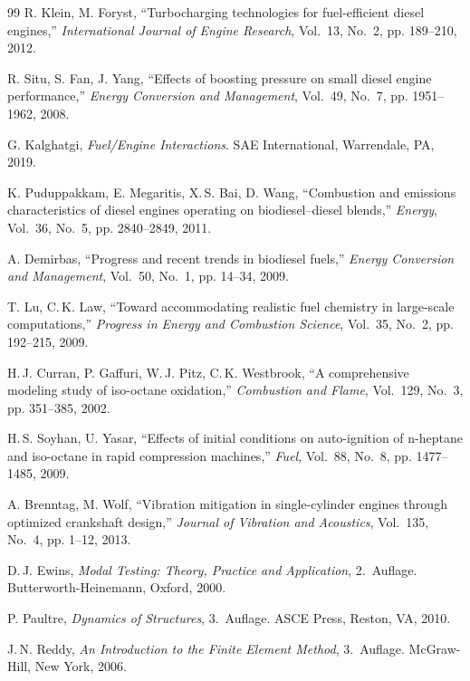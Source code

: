 ﻿\documentclass[a4paper,12pt]{article}
\begin{document}
\begin{thebibliography}{99}
	R. Klein, M. Foryst,
	``Turbocharging technologies for fuel-efficient diesel engines,''
	\textit{International Journal of Engine Research}, Vol.~13, No.~2, pp. 189--210, 2012.
	
	R. Situ, S. Fan, J. Yang,
	``Effects of boosting pressure on small diesel engine performance,''
	\textit{Energy Conversion and Management}, Vol.~49, No.~7, pp. 1951--1962, 2008.
	
	G. Kalghatgi,
	\textit{Fuel/Engine Interactions}.
	SAE International, Warrendale, PA, 2019.
	
	K. Puduppakkam, E. Megaritis, X.\,S. Bai, D. Wang,
	``Combustion and emissions characteristics of diesel engines operating on biodiesel--diesel blends,''
	\textit{Energy}, Vol.~36, No.~5, pp. 2840--2849, 2011.
	
	A. Demirbas,
	``Progress and recent trends in biodiesel fuels,''
	\textit{Energy Conversion and Management}, Vol.~50, No.~1, pp. 14--34, 2009.
	
	T. Lu, C.\,K. Law,
	``Toward accommodating realistic fuel chemistry in large-scale computations,''
	\textit{Progress in Energy and Combustion Science}, Vol.~35, No.~2, pp. 192--215, 2009.
	
	H.\,J. Curran, P. Gaffuri, W.\,J. Pitz, C.\,K. Westbrook,
	``A comprehensive modeling study of iso-octane oxidation,''
	\textit{Combustion and Flame}, Vol.~129, No.~3, pp. 351--385, 2002.
	
	H.\,S. Soyhan, U. Yasar,
	``Effects of initial conditions on auto-ignition of n-heptane and iso-octane in rapid compression machines,''
	\textit{Fuel}, Vol.~88, No.~8, pp. 1477--1485, 2009.
	
	A. Brenntag, M. Wolf,
	``Vibration mitigation in single-cylinder engines through optimized crankshaft design,''
	\textit{Journal of Vibration and Acoustics}, Vol.~135, No.~4, pp. 1--12, 2013.
	
	D.\,J. Ewins,
	\textit{Modal Testing: Theory, Practice and Application}, 2.~Auflage.
	Butterworth-Heinemann, Oxford, 2000.
	
	P. Paultre,
	\textit{Dynamics of Structures}, 3.~Auflage.
	ASCE Press, Reston, VA, 2010.
	
	J.\,N. Reddy,
	\textit{An Introduction to the Finite Element Method}, 3.~Auflage.
	McGraw-Hill, New York, 2006.
	

\end{thebibliography}
\end{document}
